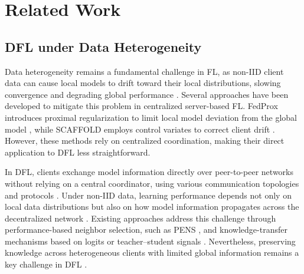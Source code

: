 \documentclass[conference]{IEEEtran}
\begin{document}

\section{Related Work}
\subsection{DFL under Data Heterogeneity}
Data heterogeneity remains a fundamental challenge in FL, as non-IID client data can cause local models to drift toward their local distributions, slowing convergence and degrading global performance \cite{zhao_non_iid}. Several approaches have been developed to mitigate this problem in centralized server-based FL. FedProx introduces proximal regularization to limit local model deviation from the global model \cite{fedprox}, while SCAFFOLD employs control variates to correct client drift \cite{scaffold}. However, these methods rely on centralized coordination, making their direct application to DFL less straightforward.

In DFL, clients exchange model information directly over peer-to-peer networks without relying on a central coordinator, using various communication topologies and protocols \cite{beltran_dfl_survey,balancingcomm,fedisp,pfedgame}. Under non-IID data, learning performance depends not only on local data distributions but also on how model information propagates across the decentralized network \cite{chung_dfl_non_iid}. Existing approaches address this challenge through performance-based neighbor selection, such as PENS \cite{pens}, and knowledge-transfer mechanisms based on logits or teacher--student signals \cite{kd_fl_guide}. Nevertheless, preserving knowledge across heterogeneous clients with limited global information remains a key challenge in DFL \cite{beltran_dfl_survey,chung_dfl_non_iid}.

\end{document}
